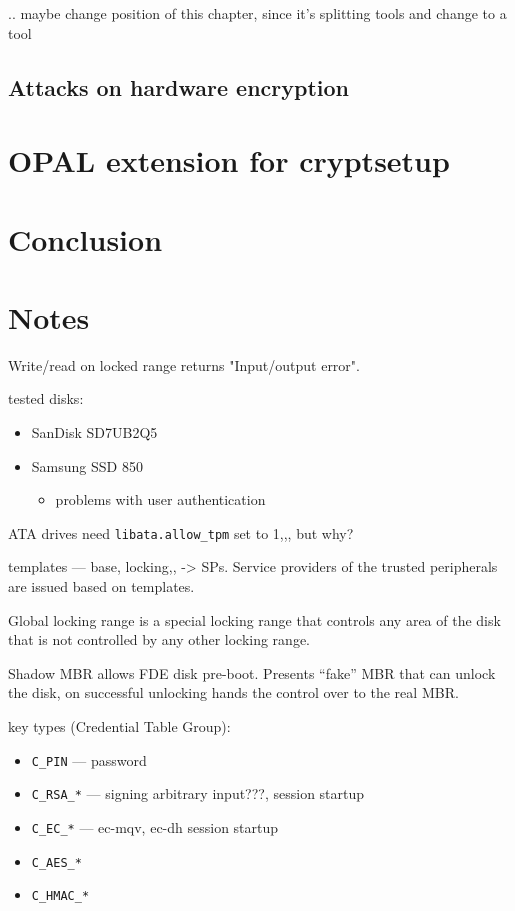 \documentclass[
  digital, %
  oneside, %
  nolof,     %
  nolot,     %
]{fithesis4}
\begin{document}
.. maybe change position of this chapter, since it's splitting tools and change to a tool

\section{Attacks on hardware encryption}

\chapter{OPAL extension for cryptsetup}

\chapter{Conclusion}



\chapter{Notes}

Write/read on locked range returns "Input/output error".

tested disks:
\begin{itemize}
    \item SanDisk SD7UB2Q5
    \item Samsung SSD 850
    \begin{itemize}
        \item problems with user authentication
    \end{itemize}
\end{itemize}

ATA drives need \verb|libata.allow_tpm| set to 1,,, but why?

templates --- base, locking,, -> SPs. Service providers of the trusted peripherals are issued based on templates.

Global locking range is a special locking range that controls any area of the disk that is not controlled by any other locking range.

Shadow MBR allows FDE disk pre-boot. Presents ``fake'' MBR that can unlock the disk, on successful unlocking hands the control over to the real MBR.

key types (Credential Table Group): \begin{itemize}
    \item \verb|C_PIN| --- password
    \item \verb|C_RSA_*| --- signing arbitrary input???, session startup
    \item \verb|C_EC_*| --- ec-mqv, ec-dh session startup
    \item \verb|C_AES_*|
    \item \verb|C_HMAC_*|
\end{itemize}
\end{document}
